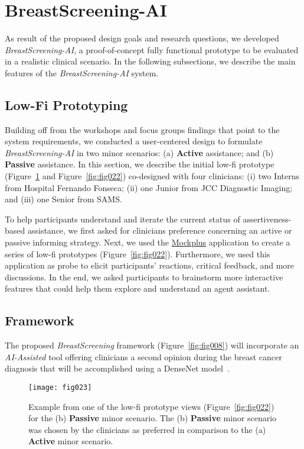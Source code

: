 \section{BreastScreening-AI}
\label{sec:sec006}

As result of the proposed design goals and research questions, we developed {\it BreastScreening-AI}, a proof-of-concept fully functional prototype to be evaluated in a realistic clinical scenario.
In the following subsections, we describe the main features of the {\it BreastScreening-AI} system.

\subsection{Low-Fi Prototyping}
\label{sec:sec00601}

Building off from the workshops and focus groups findings that point to the system requirements, we conducted a user-centered design to formulate {\it BreastScreening-AI} in two minor scenarios:
(a) {\bf Active} assistance; and
(b) {\bf Passive} assistance.
In this section, we describe the initial low-fi prototype (Figure~\ref{fig:fig023} and Figure~\ref{fig:fig022}) co-designed with four clinicians:
(i) two Interns from Hospital Fernando Fonseca;
(ii) one Junior from JCC Diagnostic Imaging; and
(iii) one Senior from SAMS.

To help participants understand and iterate the current status of assertiveness-based assistance, we first asked for clinicians preference concerning an active or passive informing strategy.
Next, we used the \hyperlink{https://www.mockplus.com}{Mockplus} application to create a series of low-fi prototypes (Figure~\ref{fig:fig022}).
Furthermore, we used this application as probe to elicit participants' reactions, critical feedback, and more discussions.
In the end, we asked participants to brainstorm more interactive features that could help them explore and understand an agent assistant.

\subsection{Framework}
\label{sec:sec00602}

The proposed {\it BreastScreening} framework (Figure~\ref{fig:fig008}) will incorporate an {\it AI-Assisted} tool offering clinicians a second opinion during the breast cancer diagnosis that will be accomplished using a DenseNet model~\cite{chen2019learning}.

\begin{figure}[htbp]
\centering
\texttt{[image: fig023]}
\caption{Example from one of the low-fi prototype views (Figure~\ref{fig:fig022}) for the (b) {\bf Passive} minor scenario. The (b) {\bf Passive} minor scenario was chosen by the clinicians as preferred in comparison to the (a) {\bf Active} minor scenario.}
\label{fig:fig023}
\end{figure}

